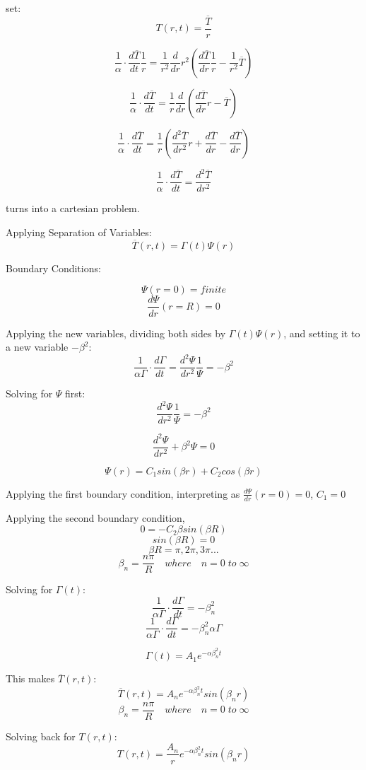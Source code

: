 \documentclass[12pt,letterpaper]{article}
\begin{document}
set:
\[T(r,t) = \frac{\overline{T}}{r} \]


\[\frac{1}{\alpha} \cdot \frac{d\overline{T}}{dt} \frac{1}{r} = \frac{1}{r^2} \frac{d}{dr} r^2 (\frac{d\overline{T}}{dr} \frac{1}{r} - \frac{1}{r^2} \overline{T}) \]

\[\frac{1}{\alpha} \cdot \frac{d\overline{T}}{dt} = \frac{1}{r} \frac{d}{dr} (\frac{d\overline{T}}{dr} r - \overline{T}) \]

\[\frac{1}{\alpha} \cdot \frac{d\overline{T}}{dt} = \frac{1}{r} (\frac{d^2\overline{T}}{dr^2} r + \frac{d\overline{T}}{dr} - \frac{d\overline{T}}{dr}) \]

\[\frac{1}{\alpha} \cdot \frac{d\overline{T}}{dt} = \frac{d^2\overline{T}}{dr^2} \]

turns into a cartesian problem.

Applying Separation of Variables:
\[\overline{T}(r,t) = \Gamma (t) \Psi (r)  \]

Boundary Conditions:

\[\Psi(r = 0) = finite \]
\[\frac{d\Psi}{dr} (r = R) = 0 \]

Applying the new variables, dividing both sides by $\Gamma (t) \Psi (r) $,
and setting it to a new variable $ -\beta^2 $:
\[\frac{1}{\alpha  \Gamma} \cdot \frac{d\Gamma}{dt} = \frac{d^2 \Psi}{dr^2} \frac{1}{\Psi} = -\beta^2 \] 

Solving for $\Psi$ first:
\[\frac{d^2 \Psi}{dr^2} \frac{1}{\Psi} = -\beta^2 \]

\[\frac{d^2 \Psi}{dr^2} + \beta^2 \Psi = 0 \]

\[\Psi (r) = C_1 sin(\beta r) + C_2 cos(\beta r) \]

Applying the first boundary condition,
interpreting as $\frac{d\Psi}{dr} (r = 0) = 0$, $C_1 = 0 $

Applying the second boundary condition,
\[0 =  -C_2 \beta sin(\beta R) \]
\[sin(\beta R) = 0  \]
\[\beta R = \pi, 2\pi, 3\pi ... \]
\[\beta_n = \frac{n\pi}{R} \quad where \quad n = 0 \; to \; \infty \]

Solving for $\Gamma(t)$:
\[\frac{1}{\alpha  \Gamma} \cdot \frac{d\Gamma}{dt} = -\beta_n^2 \]
\[\frac{1}{\alpha  \Gamma} \cdot \frac{d\Gamma}{dt} = -\beta_n^2 \alpha \Gamma \]

\[\Gamma(t) = A_1 e^{-\alpha \beta_n^2 t }\]

This makes $\overline{T}(r,t)$:
\[\overline{T}(r,t) = A_n e^{-\alpha \beta_n^2 t} sin(\beta_n r)\]
\[\beta_n = \frac{n\pi}{R} \quad where \quad n = 0 \; to \; \infty \]

Solving back for $T(r,t)$:
\[T(r,t) = \frac{A_n}{r} e^{-\alpha \beta_n^2 t} sin(\beta_n r)\]
\end{document}
